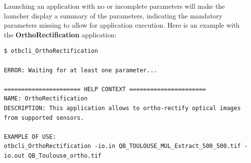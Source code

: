 Launching an application with no or incomplete parameters will make the
launcher display a summary of the parameters, indicating the mandatory parameters
missing to allow for application execution. Here is an example
with the \textbf{OrthoRectification} application:

\begin{scriptsize}
\begin{verbatim}
$ otbcli_OrthoRectification

ERROR: Waiting for at least one parameter...

====================== HELP CONTEXT ======================
NAME: OrthoRectification
DESCRIPTION: This application allows to ortho-rectify optical images from supported sensors.

EXAMPLE OF USE: 
otbcli_OrthoRectification -io.in QB_TOULOUSE_MUL_Extract_500_500.tif -io.out QB_Toulouse_ortho.tif


\end{verbatim}
\end{scriptsize}
